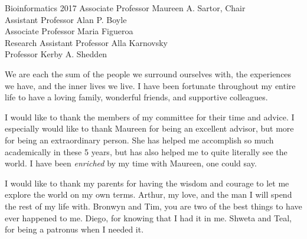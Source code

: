 \documentclass[leqno]{report}
\theoremstyle{plain}
\theoremstyle{definition}
\theoremstyle{remark}
\numberwithin{theorem}{chapter}        %
\begin{document}


{Bioinformatics} {2017}
{ Associate Professor Maureen A. Sartor, Chair \\
  Assistant Professor Alan P. Boyle \\
  Associate Professor Maria Figueroa\\
  Research Assistant Professor Alla Karnovsky\\
  Professor Kerby A. Shedden }


\initializefrontsections


\startacknowledgementspage
{We are each the sum of the people we surround ourselves with, the experiences we have, and the inner lives we live. I have been fortunate throughout my entire life to have a loving family, wonderful friends, and supportive colleagues.

I would like to thank the members of my committee for their time and advice. I especially would like to thank Maureen for being an excellent advisor, but more for being an extraordinary person. She has helped me accomplish so much academically in these 5 years, but has also helped me to quite literally see the world. I have been \emph{enriched} by my time with Maureen, one could say.

I would like to thank my parents for having the wisdom and courage to let me explore the world on my own terms. Arthur, my love, and the man I will spend the rest of my life with. Bronwyn and Tim, you are two of the best things to have ever happened to me. Diego, for knowing that I had it in me. Shweta and Teal, for being a patronus when I needed it.
}

\tableofcontents
\listoffigures
\listoftables
\end{document}
